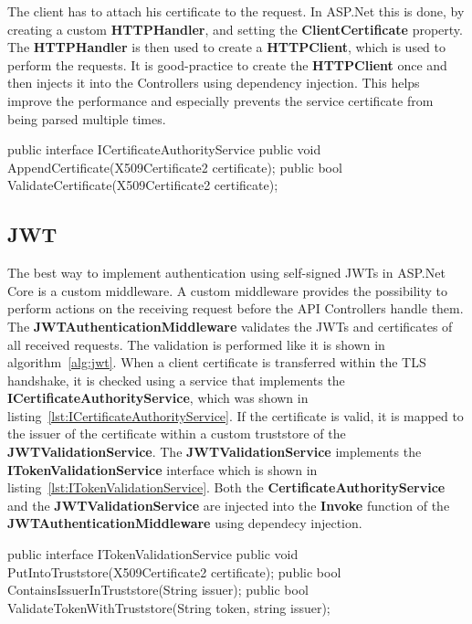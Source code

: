 The client has to attach his certificate to the request.
In ASP.Net this is done, by creating a custom \textbf{HTTPHandler}, and setting the \textbf{ClientCertificate} property.
The \textbf{HTTPHandler} is then used to create a \textbf{HTTPClient}, which is used to perform the requests.
It is good-practice to create the \textbf{HTTPClient} once and then injects it into the Controllers using dependency injection.
This helps improve the performance and especially prevents the service certificate from being parsed multiple times.

\noindent \begin{minipage}{\linewidth}
	\begin{CsCode}[label={lst:ICertificateAuthorityService}, caption={ICertificateAuthorityService interface, which is implemented by the injected CertificateAuthorityService},captionpos=b]
		public interface ICertificateAuthorityService {
			public void AppendCertificate(X509Certificate2 certificate);
			public bool ValidateCertificate(X509Certificate2 certificate);
		}
	\end{CsCode}
\end{minipage}

\subsection{JWT}
The best way to implement authentication using self-signed JWTs in ASP.Net Core is a custom middleware.
A custom middleware provides the possibility to perform actions on the receiving request before the API Controllers handle them.
The \textbf{JWTAuthenticationMiddleware} validates the JWTs and certificates of all received requests.
The validation is performed like it is shown in algorithm~\ref{alg:jwt}.
When a client certificate is transferred within the TLS handshake, it is checked using a service that implements the \textbf{ICertificateAuthorityService}, which was shown in listing~\ref{lst:ICertificateAuthorityService}.
If the certificate is valid, it is mapped to the issuer of the certificate within a custom truststore of the \textbf{JWTValidationService}.
The \textbf{JWTValidationService} implements the \textbf{ITokenValidationService} interface which is shown in listing~\ref{lst:ITokenValidationService}.
Both the \textbf{CertificateAuthorityService} and the \textbf{JWTValidationService} are injected into the \textbf{Invoke} function of the \textbf{JWTAuthenticationMiddleware} using dependecy injection.

\noindent \begin{minipage}{\linewidth}
	\begin{CsCode}[label={lst:ITokenValidationService}, caption={ITokenValidationService interface, which is implemented by the injected JWTValidationService},captionpos=b]
		public interface ITokenValidationService {
			public void PutIntoTruststore(X509Certificate2 certificate);
			public bool ContainsIssuerInTruststore(String issuer);
			public bool ValidateTokenWithTruststore(String token, string issuer);
		}
	\end{CsCode}
\end{minipage}


